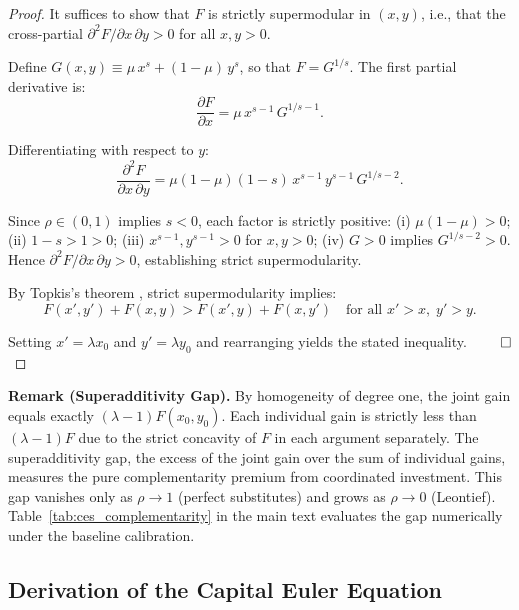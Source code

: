 	
	\begin{proof}
		It suffices to show that $F$ is strictly supermodular in $(x, y)$, i.e., that the cross-partial $\partial^2 F / \partial x \, \partial y > 0$ for all $x, y > 0$.
		
		Define $G(x,y) \equiv \mu \, x^s + (1-\mu) \, y^s$, so that $F = G^{1/s}$. The first partial derivative is:
		\begin{equation*}
			\frac{\partial F}{\partial x} = \mu \, x^{s-1} \, G^{1/s - 1}.
		\end{equation*}
		
		Differentiating with respect to $y$:
		\begin{equation*}
			\frac{\partial^2 F}{\partial x \, \partial y} = \mu(1-\mu)(1-s) \, x^{s-1} \, y^{s-1} \, G^{1/s - 2}.
		\end{equation*}
		
		Since $\rho \in (0,1)$ implies $s < 0$, each factor is strictly positive: (i) $\mu(1-\mu) > 0$; (ii) $1-s > 1 > 0$; (iii) $x^{s-1}, y^{s-1} > 0$ for $x, y > 0$; (iv) $G > 0$ implies $G^{1/s-2} > 0$. Hence $\partial^2 F / \partial x \, \partial y > 0$, establishing strict supermodularity.
		
		By Topkis's theorem \citep{topkis1998}, strict supermodularity implies:
		\begin{equation*}
			F(x', y') + F(x, y) > F(x', y) + F(x, y')
			\quad \text{for all } x' > x,\; y' > y.
		\end{equation*}
		
		Setting $x' = \lambda x_0$ and $y' = \lambda y_0$ and rearranging yields the stated inequality. $\qed$
	\end{proof}
	
	\noindent \textbf{Remark (Superadditivity Gap).} By homogeneity of degree one, the joint gain equals exactly $(\lambda - 1) F(x_0, y_0)$. Each individual gain is strictly less than $(\lambda-1) F$ due to the strict concavity of $F$ in each argument separately. The superadditivity gap, the excess of the joint gain over the sum of individual gains, measures the pure complementarity premium from coordinated investment. This gap vanishes only as $\rho \to 1$ (perfect substitutes) and grows as $\rho \to 0$ (Leontief). Table~\ref{tab:ces_complementarity} in the main text evaluates the gap numerically under the baseline calibration.
	
	\subsection{Derivation of the Capital Euler Equation} \label{app:deriv_euler}
	
